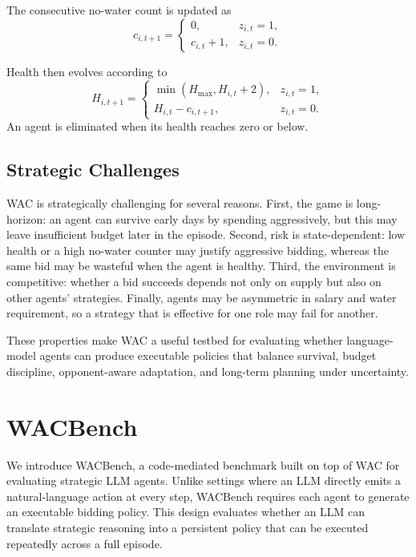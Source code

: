 \documentclass[letterpaper]{article} %
\begin{document}
The consecutive no-water count is updated as
\begin{equation}
    c_{i,t+1}
    =
    \begin{cases}
        0, & z_{i,t}=1,\\
        c_{i,t}+1, & z_{i,t}=0.
    \end{cases}
\end{equation}

Health then evolves according to
\begin{equation}
    H_{i,t+1}
    =
    \begin{cases}
        \min(H_{\max},H_{i,t}+2), & z_{i,t}=1,\\
        H_{i,t}-c_{i,t+1}, & z_{i,t}=0.
    \end{cases}
\end{equation}
An agent is eliminated when its health reaches zero or below.

\subsection{Strategic Challenges}

WAC is strategically challenging for several reasons. First, the game is long-horizon: an agent can survive early days by spending aggressively, but this may leave insufficient budget later in the episode. Second, risk is state-dependent: low health or a high no-water counter may justify aggressive bidding, whereas the same bid may be wasteful when the agent is healthy. Third, the environment is competitive: whether a bid succeeds depends not only on supply but also on other agents' strategies. Finally, agents may be asymmetric in salary and water requirement, so a strategy that is effective for one role may fail for another.

These properties make WAC a useful testbed for evaluating whether language-model agents can produce executable policies that balance survival, budget discipline, opponent-aware adaptation, and long-term planning under uncertainty.

\section{WACBench}

We introduce WACBench, a code-mediated benchmark built on top of WAC for evaluating strategic LLM agents. Unlike settings where an LLM directly emits a natural-language action at every step, WACBench requires each agent to generate an executable bidding policy. This design evaluates whether an LLM can translate strategic reasoning into a persistent policy that can be executed repeatedly across a full episode.
\end{document}
